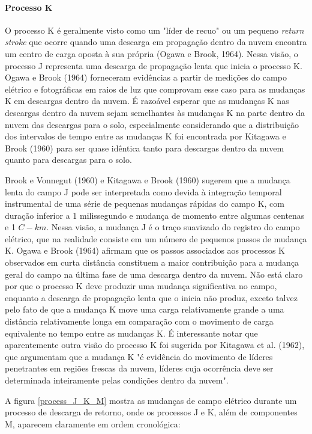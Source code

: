 \documentclass[a4paper, 12pt, onecolumn,singlespacing]{article}
\begin{document}
		
		\paragraph{Processo K}
		
		O processo K \cite{UHMAN_1987} é geralmente visto como um "líder de recuo" ou um pequeno \textit{return stroke} que ocorre quando uma descarga em propagação dentro da nuvem encontra um centro de carga oposta à sua própria (Ogawa e Brook, 1964). Nessa visão, o processo J representa uma descarga de propagação lenta que inicia o processo K. Ogawa e Brook (1964) forneceram evidências a partir de medições do campo elétrico e fotográficas em raios de luz que comprovam esse caso para as mudanças K em descargas dentro da nuvem. É razoável esperar que as mudanças K nas descargas dentro da nuvem sejam semelhantes às mudanças K na parte dentro da nuvem das descargas para o solo, especialmente considerando que a distribuição dos intervalos de tempo entre as mudanças K foi encontrada por Kitagawa e Brook (1960) para ser quase idêntica tanto para descargas dentro da nuvem quanto para descargas para o solo.
		
		Brook e Vonnegut (1960) e Kitagawa e Brook (1960) sugerem que a mudança lenta do campo J pode ser interpretada como devida à integração temporal instrumental de uma série de pequenas mudanças rápidas do campo K, com duração inferior a 1 milissegundo e mudança de momento entre algumas centenas e 1 $C-km$. Nessa visão, a mudança J é o traço suavizado do registro do campo elétrico, que na realidade consiste em um número de pequenos passos de mudança K. Ogawa e Brook (1964) afirmam que os passos associados aos processos K observados em curta distância constituem a maior contribuição para a mudança geral do campo na última fase de uma descarga dentro da nuvem. Não está claro por que o processo K deve produzir uma mudança significativa no campo, enquanto a descarga de propagação lenta que o inicia não produz, exceto talvez pelo fato de que a mudança K move uma carga relativamente grande a uma distância relativamente longa em comparação com o movimento de carga equivalente no tempo entre as mudanças K. É interessante notar que aparentemente outra visão do processo K foi sugerida por Kitagawa et al. (1962), que argumentam que a mudança K "é evidência do movimento de líderes penetrantes em regiões frescas da nuvem, líderes cuja ocorrência deve ser determinada inteiramente pelas condições dentro da nuvem".
		
		A figura \ref{process_J_K_M} mostra as mudanças de campo elétrico durante um processo de descarga de retorno, onde os processos J e K, além de componentes M, aparecem claramente em ordem cronológica:
		
\end{document}
